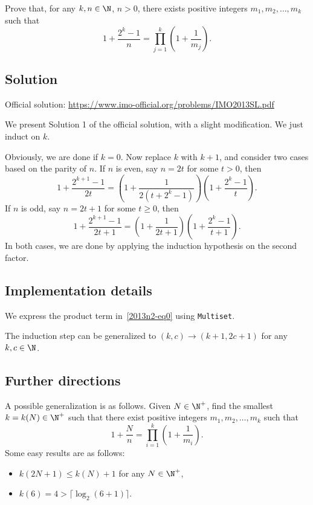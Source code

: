 Prove that, for any $k, n \in \N$, $n > 0$, there exists positive integers $m_1, m_2, \ldots, m_k$ such that
\[ 1 + \frac{2^k - 1}{n} = \prod_{j = 1}^k \left(1 + \frac{1}{m_j}\right). \tag{*}\label{2013n2-eq0} \]



\subsection*{Solution}

Official solution: \url{https://www.imo-official.org/problems/IMO2013SL.pdf}

We present Solution 1 of the official solution, with a slight modification.
We just induct on $k$.

Obviously, we are done if $k = 0$.
Now replace $k$ with $k + 1$, and consider two cases based on the parity of $n$.
If $n$ is even, say $n = 2t$ for some $t > 0$, then
\[ 1 + \frac{2^{k + 1} - 1}{2t} = \left(1 + \frac{1}{2(t + 2^k - 1)}\right) \left(1 + \frac{2^k - 1}{t}\right). \]
If $n$ is odd, say $n = 2t + 1$ for some $t \geq 0$, then
\[ 1 + \frac{2^{k + 1} - 1}{2t + 1} = \left(1 + \frac{1}{2t + 1}\right) \left(1 + \frac{2^k - 1}{t + 1}\right). \]
In both cases, we are done by applying the induction hypothesis on the second factor.



\subsection*{Implementation details}

We express the product term in~\eqref{2013n2-eq0} using \texttt{Multiset}.

The induction step can be generalized to $(k, c) \to (k + 1, 2c + 1)$ for any $k, c \in \N$.



\subsection*{Further directions}

A possible generalization is as follows.
Given $N \in \N^+$, find the smallest $k = k(N) \in \N^+$ such that
  there exist positive integers $m_1, m_2, \ldots, m_k$ such that
\[ 1 + \frac{N}{n} = \prod_{i = 1}^k \left(1 + \frac{1}{m_i}\right). \]
Some easy results are as follows:
\begin{itemize}
    \item   $k(2N + 1) \leq k(N) + 1$ for any $N \in \N^+$,
    \item   $k(6) = 4 > \lceil \log_2 (6 + 1) \rceil$.
\end{itemize}
